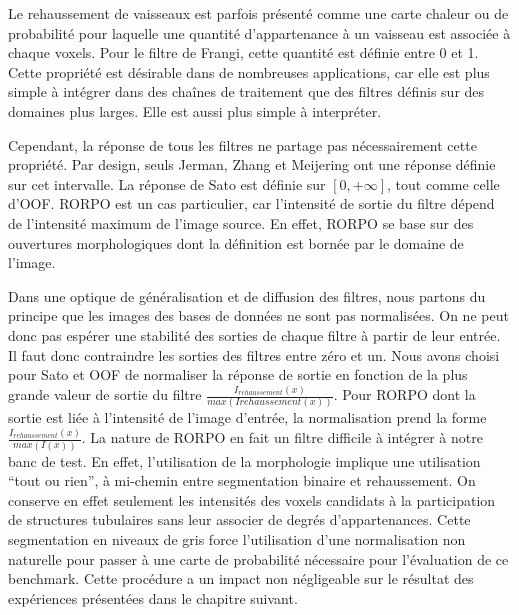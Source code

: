 Le rehaussement de vaisseaux est parfois présenté comme une carte chaleur ou de probabilité pour laquelle une quantité d'appartenance à un vaisseau est associée à chaque voxels. Pour le filtre de Frangi, cette quantité est définie entre 0 et 1. Cette propriété est désirable dans de nombreuses applications, car elle est plus simple à intégrer dans des chaînes de traitement que des filtres définis sur des domaines plus larges. Elle est aussi plus simple à interpréter.

Cependant, la réponse de tous les filtres ne partage pas nécessairement cette propriété. Par design, seuls Jerman, Zhang et Meijering ont une réponse définie sur cet intervalle. La réponse de Sato est définie sur $[0,+\infty]$, tout comme celle d'OOF. RORPO est un cas particulier, car l'intensité de sortie du filtre dépend de l'intensité maximum de l'image source. En effet, RORPO se base sur des ouvertures morphologiques dont la définition est bornée par le domaine de l'image. 

Dans une optique de généralisation et de diffusion des filtres, nous partons du principe que les images des bases de données ne sont pas normalisées. On ne peut donc pas espérer une stabilité des sorties de chaque filtre à partir de leur entrée. Il faut donc contraindre les sorties des filtres entre zéro et un. Nous avons choisi pour Sato et OOF de normaliser la réponse de sortie en fonction de la plus grande valeur de sortie du filtre $ \frac{I_{rehaussement}(x)} {max(I{rehaussement}(x))} $. Pour RORPO dont la sortie est liée à l'intensité de l'image d'entrée, la normalisation prend la forme $ \frac{I_{rehaussement}(x)} {max(I(x))} $.
La nature de RORPO en fait un filtre difficile à intégrer à notre banc de test. En effet, l'utilisation de la morphologie implique une utilisation ``tout ou rien'', à mi-chemin entre segmentation binaire et rehaussement. On conserve en effet seulement les intensités des voxels candidats à la participation de structures tubulaires sans leur associer de degrés d'appartenances. Cette segmentation en niveaux de gris force l'utilisation d'une normalisation non naturelle pour passer à une carte de probabilité nécessaire pour l'évaluation de ce benchmark. Cette procédure a un impact non négligeable sur le résultat des expériences présentées dans le chapitre suivant.


